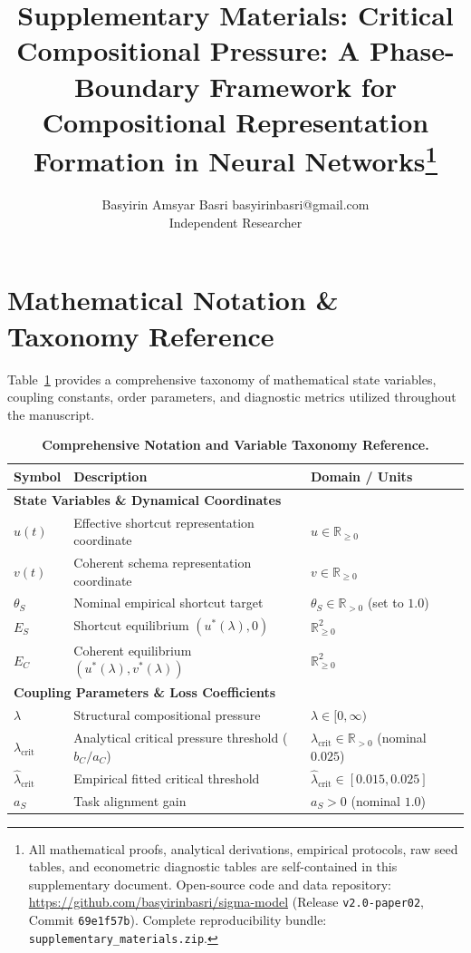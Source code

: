 \documentclass{article}
\title{Supplementary Materials: Critical Compositional Pressure: A Phase-Boundary Framework for Compositional Representation Formation in Neural Networks\thanks{All mathematical proofs, analytical derivations, empirical protocols, raw seed tables, and econometric diagnostic tables are self-contained in this supplementary document. Open-source code and data repository: \url{https://github.com/basyirinbasri/sigma-model} (Release \texttt{v2.0-paper02}, Commit \texttt{69e1f57b}). Complete reproducibility bundle: \texttt{supplementary\_materials.zip}.}}
\author{\name Basyirin Amsyar Basri \email basyirinbasri@gmail.com \\
      \addr Independent Researcher}
\theoremstyle{plain}
\theoremstyle{definition}
\begin{document}
\maketitle

\appendix

\section{Mathematical Notation \& Taxonomy Reference}
\label{sec:appendix_notation}

Table~\ref{tab:notation_taxonomy} provides a comprehensive taxonomy of mathematical state variables, coupling constants, order parameters, and diagnostic metrics utilized throughout the manuscript.

\begin{table}[h]
\centering
\caption{\textbf{Comprehensive Notation and Variable Taxonomy Reference.}}
\label{tab:notation_taxonomy}
\vskip 0.1in
\begin{small}
\begin{tabular}{lll}
\toprule
Symbol & Description & Domain / Units \\
\midrule
\multicolumn{3}{l}{\textbf{State Variables \& Dynamical Coordinates}} \\
$u(t)$ & Effective shortcut representation coordinate & $u \in \mathbb{R}_{\ge 0}$ \\
$v(t)$ & Coherent schema representation coordinate & $v \in \mathbb{R}_{\ge 0}$ \\
$\theta_S$ & Nominal empirical shortcut target & $\theta_S \in \mathbb{R}_{> 0}$ (set to $1.0$) \\
$E_S$ & Shortcut equilibrium $(u^*(\lambda), 0)$ & $\mathbb{R}_{\ge 0}^2$ \\
$E_C$ & Coherent equilibrium $(u^*(\lambda), v^*(\lambda))$ & $\mathbb{R}_{\ge 0}^2$ \\
\midrule
\multicolumn{3}{l}{\textbf{Coupling Parameters \& Loss Coefficients}} \\
$\lambda$ & Structural compositional pressure & $\lambda \in [0, \infty)$ \\
$\lambda_{\text{crit}}$ & Analytical critical pressure threshold ($b_C / a_C$) & $\lambda_{\text{crit}} \in \mathbb{R}_{> 0}$ (nominal $0.025$) \\
$\hat{\lambda}_{\text{crit}}$ & Empirical fitted critical threshold & $\hat{\lambda}_{\text{crit}} \in [0.015, 0.025]$ \\
$a_S$ & Task alignment gain & $a_S > 0$ (nominal $1.0$) \\

\end{tabular}
\end{small}
\end{table}
\end{document}
